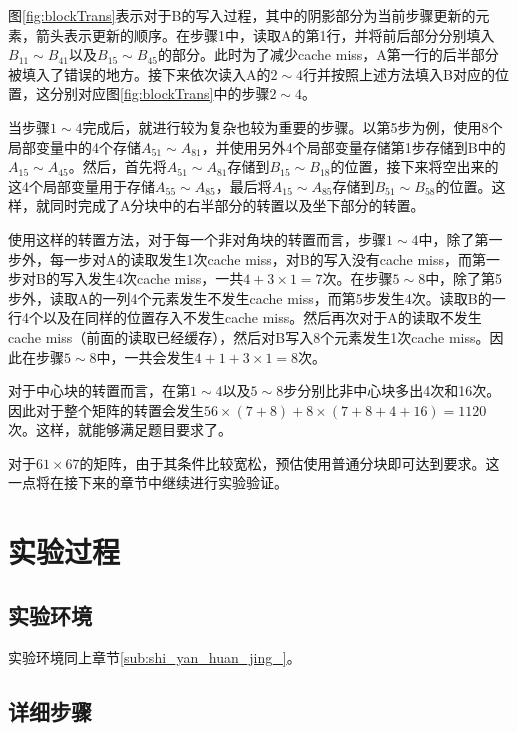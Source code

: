 \par 图\ref{fig:blockTrans}表示对于B的写入过程，其中的阴影部分为当前步骤更新的元素，箭头表示更新的顺序。在步骤1中，读取A的第1行，并将前后部分分别填入$B_{11}\sim B_{41}$以及$B_{15}\sim B_{45}$的部分。此时为了减少cache miss，A第一行的后半部分被填入了错误的地方。接下来依次读入A的$2\sim 4$行并按照上述方法填入B对应的位置，这分别对应图\ref{fig:blockTrans}中的步骤$2\sim 4$。

\par 当步骤$1\sim 4$完成后，就进行较为复杂也较为重要的步骤。以第5步为例，使用8个局部变量中的4个存储$A_{51}\sim A_{81}$，并使用另外4个局部变量存储第1步存储到B中的$A_{15}\sim A_{45}$。然后，首先将$A_{51}\sim A_{81}$存储到$B_{15}\sim B_{18}$的位置，接下来将空出来的这4个局部变量用于存储$A_{55}\sim A_{85}$，最后将$A_{15}\sim A_{85}$存储到$B_{51}\sim B_{58}$的位置。这样，就同时完成了A分块中的右半部分的转置以及坐下部分的转置。

\par 使用这样的转置方法，对于每一个非对角块的转置而言，步骤$1\sim 4$中，除了第一步外，每一步对A的读取发生1次cache miss，对B的写入没有cache miss，而第一步对B的写入发生4次cache miss，一共$4 + 3\times 1 = 7$次。在步骤$5\sim 8$中，除了第5步外，读取A的一列4个元素发生不发生cache miss，而第5步发生4次。读取B的一行4个以及在同样的位置存入不发生cache miss。然后再次对于A的读取不发生cache miss（前面的读取已经缓存），然后对B写入8个元素发生1次cache miss。因此在步骤$5\sim 8$中，一共会发生$4 + 1 + 3\times 1 = 8$次。

\par 对于中心块的转置而言，在第$1\sim 4$以及$5\sim 8$步分别比非中心块多出4次和16次。因此对于整个矩阵的转置会发生$56\times (7 + 8) + 8\times (7 + 8 + 4 + 16) = 1120$次。这样，就能够满足题目要求了。

\par 对于$61\times 67$的矩阵，由于其条件比较宽松，预估使用普通分块即可达到要求。这一点将在接下来的章节中继续进行实验验证。

\section{实验过程}
\label{sec2:shi_yan_guo_cheng_}

\subsection{实验环境}
\label{sub2:shi_yan_huan_jing_}
实验环境同上章节\ref{sub:shi_yan_huan_jing_}。

\subsection{详细步骤}
\label{sub2:shi_yan_guo_cheng_}

